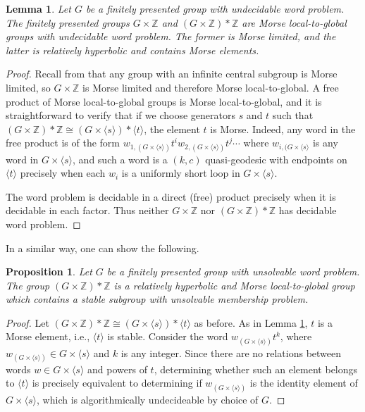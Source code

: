 \documentclass[11pt,letterpaper]{amsart}
\newtheorem{lemma}[theorem]{Lemma}
\newtheorem{proposition}[theorem]{Proposition}
\theoremstyle{definition}
\theoremstyle{plain}
\theoremstyle{TheoremNum}
\begin{document}
\begin{lemma}\label{lem:undecideable-word}
    Let $G$ be a finitely presented group with undecidable word problem. The finitely presented groups $G \times \mathbb{Z}$ and $(G \times \mathbb{Z}) * \mathbb{Z}$ are Morse local-to-global groups with undecidable word problem. The former is Morse limited, and the latter is relatively hyperbolic and contains Morse elements.
\end{lemma}
\begin{proof}
    Recall from \cite{RST} that any group with an infinite central subgroup is Morse limited, so $G \times \mathbb{Z}$ is Morse limited and therefore Morse local-to-global. A free product of Morse local-to-global groups is Morse local-to-global, and it is straightforward to verify that if we choose generators $s$ and $t$ such that $(G \times \mathbb{Z}) * \mathbb{Z} \cong (G \times \langle s \rangle ) * \langle t \rangle$, the element $t$ is Morse. Indeed, any word in the free product is of the form $w_{1, (G \times \langle s \rangle)} t^i w_{2, (G \times \langle s \rangle)} t^j \cdots$ where $w_{i, (G \times \langle s \rangle}$ is any word in $G \times \langle s \rangle$, and such a word is a $(k,c)$ quasi-geodesic with endpoints on $\langle t \rangle$ precisely when each $w_i$ is a uniformly short loop in $G \times \langle s \rangle$. 

    The word problem is decidable in a direct (free) product precisely when it is decidable in each factor. Thus neither $G \times \mathbb{Z}$ nor $(G \times \mathbb{Z}) * \mathbb{Z}$ has decidable word problem.
\end{proof}

In a similar way, one can show the following.
\begin{proposition}
    Let $G$ be a finitely presented group with unsolvable word problem. The group $(G \times \mathbb{Z}) * \mathbb{Z}$ is a relatively hyperbolic and Morse local-to-global group which contains a stable subgroup with unsolvable membership problem.
\end{proposition}
\begin{proof}
    Let $(G \times \mathbb{Z}) * \mathbb{Z} \cong (G \times \langle s \rangle) * \langle t \rangle$ as before. As in Lemma \ref{lem:undecideable-word}, $t$ is a Morse element, i.e., $\langle t \rangle$ is stable. Consider the word $w_{(G \times \langle s \rangle)} t^k$, where $w_{(G \times \langle s \rangle)} \in G \times \langle s \rangle$ and $k$ is any integer. Since there are no relations between words $w \in G \times \langle s \rangle$ and powers of $t$, determining whether such an element belongs to $\langle t \rangle$ is precisely equivalent to determining if $w_{(G \times \langle s \rangle)}$ is the identity element of $G \times \langle s \rangle$, which is algorithmically undecideable by choice of $G$.
\end{proof}


 
\end{document}
